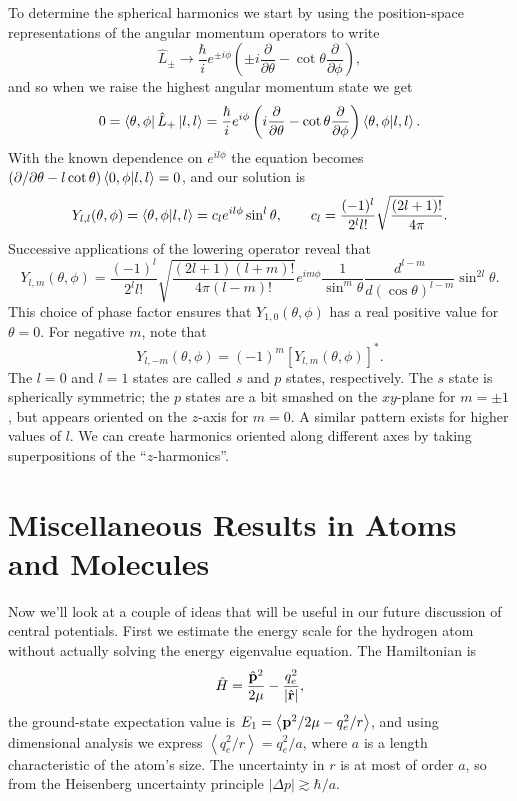 \documentclass[../p116main.tex]{subfiles}
\begin{document}
To determine the spherical harmonics we start by using the position-space representations of the angular momentum operators to write
\[ \hat L_\pm \to \frac{\hbar}{i} e^{\pm i \phi} \left( \pm i \frac{\partial}{\partial \theta} - \cot \theta \frac{\partial}{\partial \phi} \right), \]
and so when we raise the highest angular momentum state we get
\[ 0 = \left< \theta, \phi \right| \hat L_+ \left| l,l \right> = \frac{\hbar}{i} e^{i\phi} \left( i \frac{\partial}{\partial \theta} - \cot \theta \frac{\partial}{\partial \phi} \right) \left< \theta, \phi \middle| l,l \right>. \]
With the known dependence on $e^{il\phi}$ the equation becomes $(\partial / \partial \theta - l \cot \theta) \left< 0, \phi \middle| l,l \right> = 0$, and our solution is
\[ Y_{l,l}(\theta, \phi) = \left< \theta, \phi \middle| l,l \right> = c_l e^{il\phi} \sin^{l} \theta, \qquad c_l = \frac{(-1)^{l}}{2^l l!} \sqrt{\frac{(2l+1)!}{4\pi}}. \]
Successive applications of the lowering operator reveal that
\[ Y_{l,m}(\theta, \phi) = \frac{(-1)^{l}}{2^l l!} \sqrt{\frac{(2l + 1)(l+m)!}{4\pi (l-m)!}} e^{im\phi} \frac{1}{\sin^m \theta} \frac{d^{l-m}}{d(\cos \theta)^{l-m}} \sin^{2l} \theta. \]
This choice of phase factor ensures that $Y_{1,0}(\theta, \phi)$ has a real positive value for $\theta = 0$.
For negative $m$, note that
\[ Y_{l, -m}(\theta, \phi) = (-1)^{m} [Y_{l,m}(\theta, \phi)]^*. \]
The $l=0$ and $l=1$ states are called $s$ and $p$ states, respectively.
The $s$ state is spherically symmetric; the $p$ states are a bit smashed on the $xy$-plane for $m = \pm 1$, but appears oriented on the $z$-axis for $m=0$.
A similar pattern exists for higher values of $l$.
We can create harmonics oriented along different axes by taking superpositions of the ``$z$-harmonics''.

\section{Miscellaneous Results in Atoms and Molecules}
Now we'll look at a couple of ideas that will be useful in our future discussion of central potentials.
First we estimate the energy scale for the hydrogen atom without actually solving the energy eigenvalue equation.
The Hamiltonian is
\[ \hat H = \frac{\hat{\mathbf{p}}^2}{2\mu} - \frac{q_e^2}{|\hat{\mathbf{r}}|}, \]
the ground-state expectation value is $E_1 = \left< \mathbf{p}^2 / 2\mu - q_e^2 / r \right>$, and using dimensional analysis we express $\left< q_e^2 / r \right> = q_e^2 / a$, where $a$ is a length characteristic of the atom's size.
The uncertainty in $r$ is at most of order $a$, so from the Heisenberg uncertainty principle $|\Delta p| \gtrsim \hbar / a$.
\end{document}
